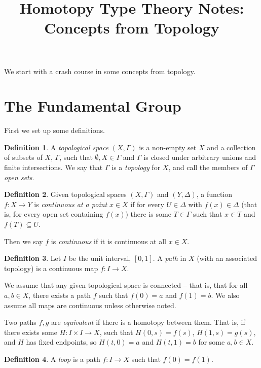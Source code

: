 \documentclass[a4paper,12pt]{article}
\title{Homotopy Type Theory Notes: Concepts from Topology}
\author{}
\newcommand{\sub}{\subseteq}
\newcommand{\sub}{\subseteq}
\theoremstyle{definition}
\newtheorem*{defn}{Definition}
\begin{document}
\maketitle

We start with a crash course in some concepts from topology.

\section{The Fundamental Group}

First we set up some definitions.

\begin{defn}
A \emph{topological space} $(X, \Gamma)$ is a non-empty set $X$ and a collection of subsets of $X$, $\Gamma$, such that $\emptyset, X\in \Gamma$ and $\Gamma$ is closed under arbitrary unions and finite intersections.
We say that $\Gamma$ is a \emph{topology} for $X$, and call the members of $\Gamma$ \emph{open sets}.
\end{defn}

\begin{defn}
Given topological spaces $(X, \Gamma)$ and $(Y, \Delta)$, a function $f: X\to Y$ is \emph{continuous at a point} $x\in X$ if for every $U\in\Delta$ with $f(x)\in \Delta$ (that is, for every open set containing $f(x)$) there is some $T\in \Gamma$ such that $x\in T$ and $f(T)\sub U$.

Then we say $f$ is \emph{continuous} if it is continuous at all $x\in X$.
\end{defn}

\begin{defn}
Let $I$ be the unit interval, $[0, 1]$.
A \emph{path} in $X$ (with an associated topology) is a continuous map $f: I\to X$.
\end{defn}

We assume that any given topological space is connected -- that is, that for all $a, b\in X$, there exists a path $f$ such that $f(0) = a$ and $f(1) = b$.
We also assume all maps are continuous unless otherwise noted.

Two paths $f, g$ are \emph{equivalent} if there is a homotopy between them.
That is, if there exists some $H: I\times I\to X$, such that $H(0, s) = f(s)$, $H(1, s) = g(s)$, and $H$ has fixed endpoints, so $H(t, 0) = a$ and $H(t, 1) = b$ for some $a, b\in X$.

\begin{defn}
A \emph{loop} is a path $f: I\to X$ such that $f(0) = f(1)$.
\end{defn}
\end{document}
